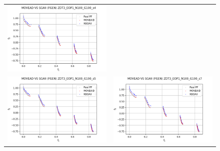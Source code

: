 \begin{figure}[H]
\begin{tabular}{c c}
    \includegraphics[scale=0.5]{figures/ZDT3_EOP1_N100_G100_T15/s4_comp.png}\\
    \includegraphics[scale=0.5]{figures/ZDT3_EOP1_N100_G100_T15/s5_comp.png} &
    \includegraphics[scale=0.5]{figures/ZDT3_EOP1_N100_G100_T15/s7_comp.png}\\

\end{tabular}
\end{figure}
